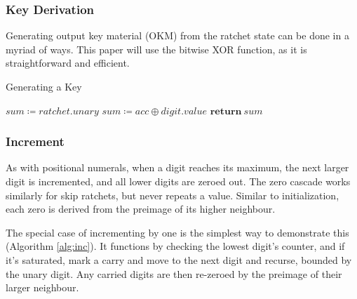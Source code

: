 \documentclass[twocolumn]{article}
\begin{document}
	\subsubsection{Key Derivation}

	Generating output key material (OKM) from the ratchet state can be done in a myriad of ways. This paper will use the bitwise \textsf{XOR} function, as it is straightforward and efficient.

	\begin{algorithm*}
		\caption{Generating a Key}
		\label{alg:toKey}

		\begin{algorithmic}[1]
				\State $sum \coloneqq ratchet.unary$
					\State $sum \coloneqq acc \oplus digit.value$
				\EndFor
				\State $\textbf{return}\ sum$
			\EndFunction
		\end{algorithmic}
	\end{algorithm*}
	
	\subsubsection{Increment}
	
	As with positional numerals, when a digit reaches its maximum, the next larger digit is incremented, and all lower digits are zeroed out. The zero cascade works similarly for skip ratchets, but never repeats a value. Similar to initialization, each zero is derived from the preimage of its higher neighbour.
	
	The special case of incrementing by one is the simplest way to demonstrate this (Algorithm \ref{alg:inc}). It functions by checking the lowest digit's counter, and if it's saturated, mark a carry and move to the next digit and recurse, bounded by the unary digit. Any carried digits are then re-zeroed by the preimage of their larger neighbour.
	
\end{document}
